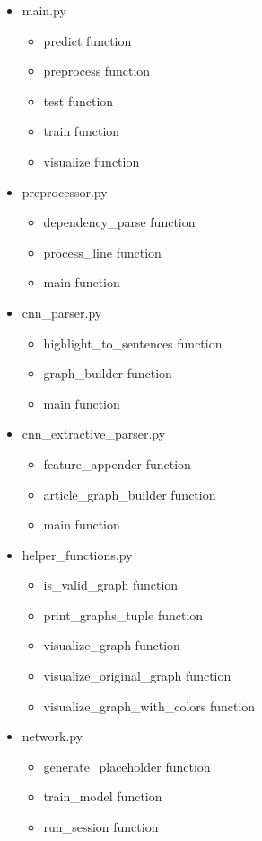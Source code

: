\begin{itemize}
	\item main.py
	\begin{itemize}
		\item predict function
		\item preprocess function
		\item test function
		\item train function
		\item visualize function
	\end{itemize}
	\item preprocessor.py
	\begin{itemize}
		\item dependency\_parse function
		\item process\_line function
		\item main function
	\end{itemize}
	\item cnn\_parser.py
	\begin{itemize}
		\item highlight\_to\_sentences function
		\item graph\_builder function
		\item main function
	\end{itemize}
	\item cnn\_extractive\_parser.py
	\begin{itemize}
		\item feature\_appender function
		\item article\_graph\_builder function
		\item main function
	\end{itemize}
	\item helper\_functions.py
	\begin{itemize}
		\item is\_valid\_graph function
		\item print\_graphs\_tuple function
		\item visualize\_graph function
		\item visualize\_original\_graph function
		\item visualize\_graph\_with\_colors function
	\end{itemize}
	\item network.py
	\begin{itemize}
		\item generate\_placeholder function
		\item train\_model function
		\item run\_session function

\end{itemize}
\end{itemize}
